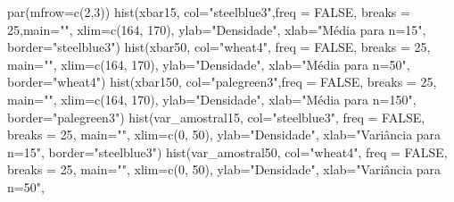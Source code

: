 \documentclass[
  letterpaper,
  DIV=11,
  numbers=noendperiod]{scrartcl}
\newenvironment{Shaded}{\begin{snugshade}}{\end{snugshade}}
\newcommand{\AttributeTok}[1]{\textcolor[rgb]{0.40,0.45,0.13}{#1}}
\newcommand{\ConstantTok}[1]{\textcolor[rgb]{0.56,0.35,0.01}{#1}}
\newcommand{\DecValTok}[1]{\textcolor[rgb]{0.68,0.00,0.00}{#1}}
\newcommand{\FunctionTok}[1]{\textcolor[rgb]{0.28,0.35,0.67}{#1}}
\newcommand{\NormalTok}[1]{\textcolor[rgb]{0.00,0.23,0.31}{#1}}
\newcommand{\StringTok}[1]{\textcolor[rgb]{0.13,0.47,0.30}{#1}}
\begin{document}
\begin{Shaded}
\begin{Highlighting}[]
\FunctionTok{par}\NormalTok{(}\AttributeTok{mfrow=}\FunctionTok{c}\NormalTok{(}\DecValTok{2}\NormalTok{,}\DecValTok{3}\NormalTok{))}
\FunctionTok{hist}\NormalTok{(xbar15, }\AttributeTok{col=}\StringTok{"steelblue3"}\NormalTok{,}\AttributeTok{freq =} \ConstantTok{FALSE}\NormalTok{, }\AttributeTok{breaks =} \DecValTok{25}\NormalTok{,}\AttributeTok{main=}\StringTok{""}\NormalTok{,}
     \AttributeTok{xlim=}\FunctionTok{c}\NormalTok{(}\DecValTok{164}\NormalTok{, }\DecValTok{170}\NormalTok{), }\AttributeTok{ylab=}\StringTok{"Densidade"}\NormalTok{, }\AttributeTok{xlab=}\StringTok{"Média para n=15"}\NormalTok{,}
     \AttributeTok{border=}\StringTok{"steelblue3"}\NormalTok{)}
\FunctionTok{hist}\NormalTok{(xbar50, }\AttributeTok{col=}\StringTok{"wheat4"}\NormalTok{, }\AttributeTok{freq =} \ConstantTok{FALSE}\NormalTok{, }\AttributeTok{breaks =} \DecValTok{25}\NormalTok{, }\AttributeTok{main=}\StringTok{""}\NormalTok{,}
     \AttributeTok{xlim=}\FunctionTok{c}\NormalTok{(}\DecValTok{164}\NormalTok{, }\DecValTok{170}\NormalTok{), }\AttributeTok{ylab=}\StringTok{"Densidade"}\NormalTok{, }\AttributeTok{xlab=}\StringTok{"Média para n=50"}\NormalTok{,}
     \AttributeTok{border=}\StringTok{"wheat4"}\NormalTok{)}
\FunctionTok{hist}\NormalTok{(xbar150, }\AttributeTok{col=}\StringTok{"palegreen3"}\NormalTok{,}\AttributeTok{freq =} \ConstantTok{FALSE}\NormalTok{, }\AttributeTok{breaks =} \DecValTok{25}\NormalTok{, }\AttributeTok{main=}\StringTok{""}\NormalTok{,}
     \AttributeTok{xlim=}\FunctionTok{c}\NormalTok{(}\DecValTok{164}\NormalTok{, }\DecValTok{170}\NormalTok{), }\AttributeTok{ylab=}\StringTok{"Densidade"}\NormalTok{, }\AttributeTok{xlab=}\StringTok{"Média para n=150"}\NormalTok{,}
     \AttributeTok{border=}\StringTok{"palegreen3"}\NormalTok{)}
\FunctionTok{hist}\NormalTok{(var\_amostral15, }\AttributeTok{col=}\StringTok{"steelblue3"}\NormalTok{, }\AttributeTok{freq =} \ConstantTok{FALSE}\NormalTok{, }\AttributeTok{breaks =} \DecValTok{25}\NormalTok{, }\AttributeTok{main=}\StringTok{""}\NormalTok{,}
     \AttributeTok{xlim=}\FunctionTok{c}\NormalTok{(}\DecValTok{0}\NormalTok{, }\DecValTok{50}\NormalTok{), }\AttributeTok{ylab=}\StringTok{"Densidade"}\NormalTok{, }\AttributeTok{xlab=}\StringTok{"Variância para n=15"}\NormalTok{,}
     \AttributeTok{border=}\StringTok{"steelblue3"}\NormalTok{)}
\FunctionTok{hist}\NormalTok{(var\_amostral50, }\AttributeTok{col=}\StringTok{"wheat4"}\NormalTok{, }\AttributeTok{freq =} \ConstantTok{FALSE}\NormalTok{, }\AttributeTok{breaks =} \DecValTok{25}\NormalTok{, }\AttributeTok{main=}\StringTok{""}\NormalTok{,}
     \AttributeTok{xlim=}\FunctionTok{c}\NormalTok{(}\DecValTok{0}\NormalTok{, }\DecValTok{50}\NormalTok{), }\AttributeTok{ylab=}\StringTok{"Densidade"}\NormalTok{, }\AttributeTok{xlab=}\StringTok{"Variância para n=50"}\NormalTok{, }

\end{Highlighting}
\end{Shaded}
\end{document}
